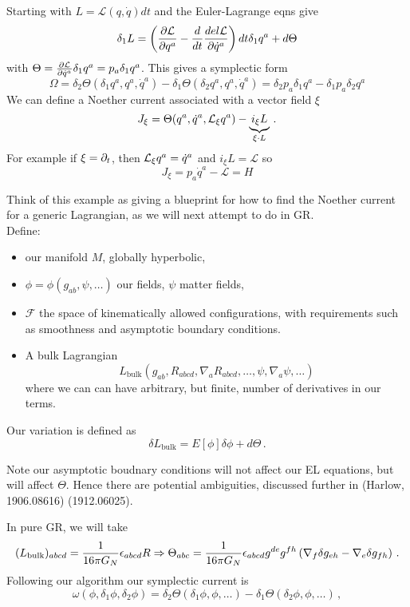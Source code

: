 \documentclass{article}
\begin{document}
\begin{example}
	Starting with $L = \mathcal{L}(q, \dot{q}) dt$ and the Euler-Lagrange eqns give 
	\[
	\delta_1  L = \left( \frac{\partial \mathcal{L}}{\partial q^a} - \frac{d}{dt} \frac{del \mathcal{L}}{\partial \dot{q}^a} \right) dt \delta_1 q^a + d\Theta
	\]
	with $\Theta = \frac{\partial \mathcal{L}}{\partial \dot{q}^a} \delta_1 q^a = p_a \delta_1 q^a$. This gives a symplectic form 
	\[
	\Omega = \delta_2 \Theta(\delta_1 q^a , q^a, \dot{q}^a) - \delta_1 \Theta(\delta_2 q^a, q^a, \dot{q}^a) = \delta_2 p_a \delta_1 q^a - \delta_1 p_a \delta_2 q^a
	\]
	We can define a Noether current associated with a vector field $\xi$ 
	\[
	J_\xi = \Theta(q^a, \dot{q}^a ,\mathcal{L}_\xi q^a) - \underbrace{i_\xi L}_{\xi \cdot L} \, .
	\]
	For example if $\xi = \partial_t$, then $\mathcal{L}_\xi q^a = \dot{q}^a$ and $i_\xi L = \mathcal{L}$ so 
	\[
	J_\xi = p_a \dot{q}^a - \mathcal{L} = H 
	\]
\end{example}
Think of this example as giving a blueprint for how to find the Noether current for a generic Lagrangian, as we will next attempt to do in GR. \\
Define:
\begin{itemize}
	\item our manifold $M$, globally hyperbolic, 
	\item $\phi = \phi(g_{ab}, \psi, \dots)$ our fields, $\psi$ matter fields,  
	\item $\mathcal{F}$ the space of kinematically allowed configurations, with requirements such as smoothness and asymptotic boundary conditions. 
	\item A bulk Lagrangian 
	\[
	L_{\text{bulk}}(g_{ab}, R_{abcd}, \nabla_a R_{abcd}, \dots, \psi, \nabla_a \psi, \dots)
	\]
	where we can can have arbitrary, but finite, number of derivatives in our terms. 
\end{itemize}
Our variation is defined as 
\[
\delta L_{\text{bulk}} = E[\phi] \delta \phi + d \Theta \, .
\]
\begin{remark}
	Note our asymptotic boudnary conditions will not affect our EL equations, but will affect $\Theta$. Hence there are potential ambiguities, discussed further in (Harlow, 1906.08616) (1912.06025). 
\end{remark}
In pure GR, we will take 
\[
(L_{\text{bulk}})_{abcd} = \frac{1}{16 \pi G_N} \epsilon_{abcd} R  \Rightarrow \Theta_{abc} = \frac{1}{16 \pi G_N} \epsilon_{abcd} g^{de} g^{fh} \left( \nabla_f \delta g_{eh} -\nabla_e \delta g_{fh}  \right) \, .
\]
Following our algorithm our symplectic current is 
\[
\omega(\phi ,\delta_1 \phi, \delta_2 \phi) = \delta_2 \Theta (\delta_1 \phi, \phi, \dots) - \delta_1 \Theta(\delta_2 \phi, \phi, \dots) \, ,
\]
\end{document}
